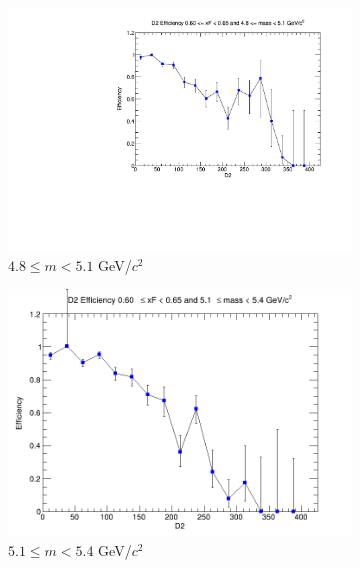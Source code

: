 \begin{figure}[p]
\begin{subfigure}[b]{0.32\textwidth}
        \centering
        \includegraphics[width=\textwidth]{./kTrackerEfficiencyPlots/D2_Efficiency_xF12_mass2.pdf}
        \caption{$4.8 \leq m < 5.1$ GeV/$c^2$}
        \label{fig:xF12_mass2}
    \end{subfigure}
    \vspace{0.5cm}
    \begin{subfigure}[b]{0.32\textwidth}
        \centering
        \includegraphics[width=\textwidth]{./kTrackerEfficiencyPlots/D2_Efficiency_xF12_mass3.png}
        \caption{$5.1 \leq m < 5.4$ GeV/$c^2$}
        \label{fig:xF12_mass3}
    \end{subfigure}
    \hfill
    \begin{subfigure}[b]{0.32\textwidth}
        \centering

\end{subfigure}
\end{figure}

